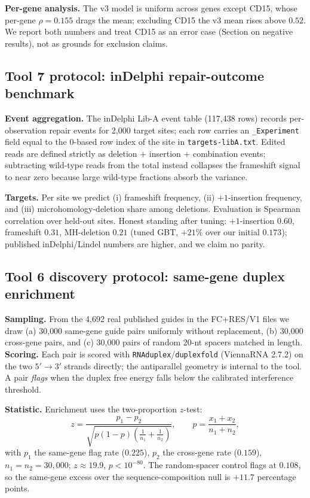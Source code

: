 \textbf{Per-gene analysis.} The v3 model is uniform across genes except
CD15, whose per-gene $\rho = 0.155$ drags the mean; excluding CD15 the v3
mean rises above $0.52$. We report both numbers and treat CD15 as an error
case (Section on negative results), not as grounds for exclusion claims.

\subsection{Tool 7 protocol: inDelphi repair-outcome benchmark}
\textbf{Event aggregation.} The inDelphi Lib-A event table (117{,}438 rows)
records per-observation repair events for 2{,}000 target sites; each row
carries an \texttt{\_Experiment} field equal to the 0-based row index of the
site in \texttt{targets-libA.txt}. Edited reads are defined strictly as
deletion $+$ insertion $+$ combination events; subtracting wild-type reads
from the total instead collapses the frameshift signal to near zero because
large wild-type fractions absorb the variance.

\textbf{Targets.} Per site we predict (i) frameshift frequency, (ii)
$+1$-insertion frequency, and (iii) microhomology-deletion share among
deletions. Evaluation is Spearman correlation over held-out sites.
Honest standing after tuning: $+1$-insertion $0.60$, frameshift $0.31$,
MH-deletion $0.21$ (tuned GBT, $+21\%$ over our initial $0.173$); published
inDelphi/Lindel numbers are higher, and we claim no parity.

\subsection{Tool 6 discovery protocol: same-gene duplex enrichment}
\textbf{Sampling.} From the 4{,}692 real published guides in the FC+RES/V1
files we draw (a) 30{,}000 same-gene guide pairs uniformly without
replacement, (b) 30{,}000 cross-gene pairs, and (c) 30{,}000 pairs of random
20-nt spacers matched in length. \textbf{Scoring.} Each pair is scored with
\texttt{RNAduplex}/\texttt{duplexfold} (ViennaRNA 2.7.2) on the two
$5'\to3'$ strands directly; the antiparallel geometry is internal to the
tool. A pair \emph{flags} when the duplex free energy falls below the
calibrated interference threshold.

\textbf{Statistic.} Enrichment uses the two-proportion $z$-test:
\begin{equation}
z = \frac{p_1 - p_2}{\sqrt{p(1-p)\left(\frac{1}{n_1}+\frac{1}{n_2}\right)}},
\qquad
p = \frac{x_1 + x_2}{n_1 + n_2},
\end{equation}
with $p_1$ the same-gene flag rate ($0.225$), $p_2$ the cross-gene rate
($0.159$), $n_1=n_2=30{,}000$; $z \approx 19.9$, $p < 10^{-80}$. The
random-spacer control flags at $0.108$, so the same-gene excess over the
sequence-composition null is $+11.7$ percentage points.

